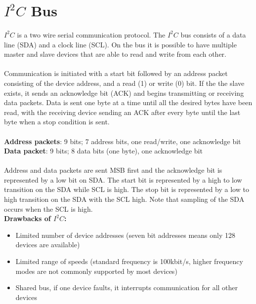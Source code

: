 \section{$I^{2}C$ Bus}
\paragraph{}
$I^{2}C$ is a two wire serial communication protocol.  The $I^{2}C$ bus consists of a data line (SDA) and a clock line (SCL).  On the bus it is possible to have multiple master and slave devices that are able to read and write from each other.
\paragraph{}
Communication is initiated with a start bit followed by an address packet consisting of the device address, and a read (1) or write (0) bit.  If the the slave exists, it sends an acknowledge bit (ACK) and begins transmitting or receiving data packets.  Data is sent one byte at a time until all the desired bytes have been read, with the receiving device sending an ACK after every byte until the last byte when a stop condition is sent.\\\\
	\textbf{Address packets}: 9 bits; 7 address bits, one read/write, one acknowledge bit
	\textbf{Data packet}: 9 bits; 8 data bits (one byte), one acknowledge bit
\paragraph{}
Address and data packets are sent MSB first and the acknowledge bit is represented by a low bit on SDA.  The start bit is represented by a high to low transition on the SDA while SCL is high.  The stop bit is represented by a low to high transition on the SDA with the SCL high.  Note that sampling of the SDA occurs when the SCL is high.\\

\textbf{Drawbacks of $I^{2}C$:}
\begin{itemize}
\item Limited number of device addresses (seven bit addresses means only 128 devices are available)
\item Limited range of speeds (standard frequency is 100kbit/s, higher frequency modes are not commonly supported by most devices)
\item Shared bus, if one device faults, it interrupts communication for all other devices
\end{itemize}


